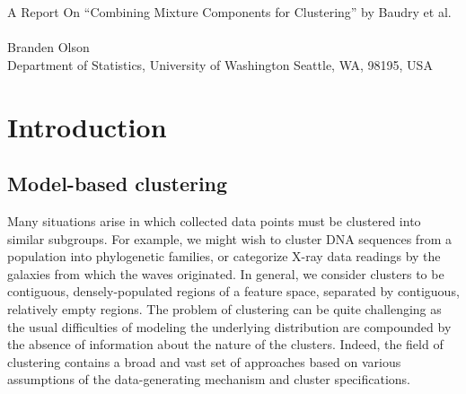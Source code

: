 \documentclass{uwstat572}
\renewcommand\;{\,}
\begin{document}

\begin{center}
  {\LARGE A Report On ``Combining Mixture Components for Clustering'' by Baudry et al.}\\\ \\
  {Branden Olson\\ 
    Department of Statistics, University of Washington Seattle, WA, 98195, USA
  }
\end{center}



\begin{abstract}
Model-based clustering typically assumes an underlying Gaussian mixture model in which the number of mixture components is unknown. 
The familiar Bayesian information criterion excels at inferring the number of components when the Gaussian approximation holds.
However, the presence of non-Gaussian groups violates the assumption that each component represents its own cluster, leading to an overestimation of the number of groups.
A modification known as the integrated complete likelihood criterion more accurately infers the number of groups by penalizing model entropy.
Nonetheless, this criterion often misconstrues non-Gaussian groups as Gaussian, thus underestimating the number of components.
\citet{Baudry10} resolve this dilemma by iteratively merging components to minimize entropy, allowing groups to be Gaussian mixtures themselves.
This yields a sequence of clusterings starting from the BIC solution from which the modeler can choose a preferred representative based on various criteria.
We apply the merging technique to simulated and real data, demonstrating competitive performance.
\end{abstract}

\section{Introduction}

\subsection{Model-based clustering}
Many situations arise in which collected data points must be clustered into similar subgroups. 
For example, we might wish to cluster DNA sequences from a population into phylogenetic families, or categorize X-ray data readings by the galaxies from which the waves originated.
In general, we consider clusters to be contiguous, densely-populated regions of a feature space, separated by contiguous, relatively empty regions.
The problem of clustering can be quite challenging as the usual difficulties of modeling the underlying distribution are compounded by the absence of information about the nature of the clusters.
Indeed, the field of clustering contains a broad and vast set of approaches based on various assumptions of the data-generating mechanism and cluster specifications.
\end{document}

